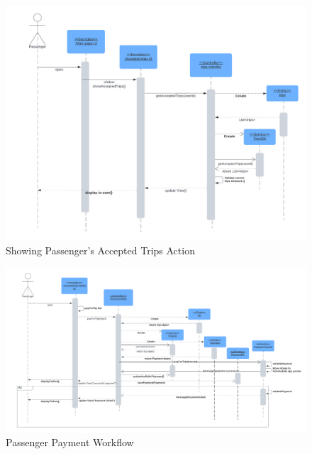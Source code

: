 \documentclass[a4paper, 12pt]{report} %
\begin{document}
        \begin{figure}
            \centering
            \includegraphics[width=0.9\linewidth]{Images/Passenger Accepted.png}
            \caption{Showing Passenger's Accepted Trips Action}
            \label{fig:seq_dig_pass_accepted}
        \end{figure}

        \FloatBarrier


        \begin{figure}
            \centering
            \includegraphics[width=\linewidth]{Images/Passenger Payment.png}
            \caption{Passenger Payment Workflow}
            \label{fig:seq_dig_pass_payment}
        \end{figure}
\end{document}
